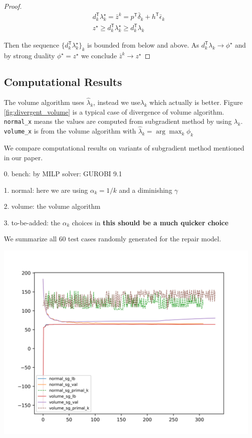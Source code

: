\begin{proof}
  \[\begin{aligned}
       & d_k^\mathsf{T} \lambda_k^\star = \bar z^k = p^\mathsf{T} \bar \delta_k + h^\mathsf{T} \bar \epsilon_k \\
       & z^\star \ge d_k^\mathsf{T} \lambda_k^\star \ge  d_k^\mathsf{T} \lambda_k
    \end{aligned}\]

  Then the sequence \(\displaystyle\{d_k^\mathsf{T} \lambda_k^\star\}_k\)
  is bounded from below and above. As
  \(d_k^\mathsf{T} \lambda_k \to \phi^\star\) and by strong duality
  \(\phi^\star = z^\star\) we conclude \(\bar z^k \to z^\star\)
\end{proof}
\hypertarget{computational-results}{%
  \subsection{Computational Results}\label{computational-results}}



The volume algorithm uses \(\hat \lambda_{k}\), instead we use\(\lambda_{k}\) which actually is better.
Figure \ref{fig:divergent_volume} is a typical case of divergence of volume algorithm.
\texttt{normal\_x} means the values are computed from subgradient
method by using \(\lambda_{k}\). \texttt{volume\_x} is from the volume
algorithm with \(\hat \lambda_{k} = \arg\max_k \hat \phi_{k}\)

We compare computational results on variants of subgradient method mentioned in our paper.

0. bench: by MILP solver: GUROBI 9.1

1. normal: here we are using \(\alpha_k = 1/k\) and a diminishing \(\gamma\)

2. volume: the volume algorithm

3. to-be-added: the \(\alpha_k\) choices in \cite{brannlund1995generalized} \textbf{this should be a much quicker choice}

We summarize all \(60\) test cases randomly generated for the repair model.



\includegraphics{../imgs/conv_0_15_15.png}\label{fig:divergent_volume}


\hypertarget{refs}{}




